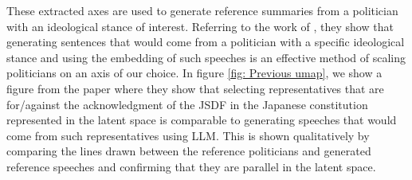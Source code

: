 \documentclass[final,5p,times,twocolumn,authoryear]{elsarticle}
\begin{document}
These extracted axes are used to generate reference summaries from a politician with an ideological stance of interest. Referring to the work of \citeauthor{kato2024lupinllmbasedpoliticalideology}, they show that generating sentences that would come from a politician with a specific ideological stance and using the embedding of such speeches is an effective method of scaling politicians on an axis of our choice. In figure \ref{fig: Previous umap}, we show a figure from the paper where they show that selecting representatives that are for/against the acknowledgment of the JSDF in the Japanese constitution represented in the latent space is comparable to generating speeches that would come from such representatives using LLM. This is shown qualitatively by comparing the lines drawn between the reference politicians and generated reference speeches and confirming that they are parallel in the latent space.
\end{document}
